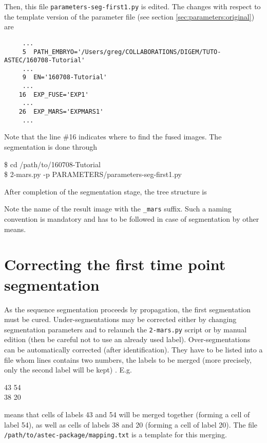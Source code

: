 Then, this file \texttt{parameters-seg-first1.py} is edited. The changes with respect to the template version of the parameter file (see section \ref{sec:parameters:original}) are

\begin{verbatim}
     ...
     5	PATH_EMBRYO='/Users/greg/COLLABORATIONS/DIGEM/TUTO-ASTEC/160708-Tutorial'	
     ...
     9	EN='160708-Tutorial'			
     ... 
    16	EXP_FUSE='EXP1'	
     ...
    26	EXP_MARS='EXPMARS1'		
     ...
\end{verbatim}

Note that the line \#16 indicates where to find the fused images.
The segmentation is done through

\begin{code}{0.8}
\$ cd /path/to/160708-Tutorial\\
\$ 2-mars.py -p PARAMETERS/parameters-seg-first1.py 
\end{code}


After completion of the segmentation stage, the tree structure is 

Note the name of the result image with the \texttt{\_mars} suffix. Such a naming convention is mandatory and has to be followed in case of segmentation by other means.










\section{Correcting the first time point segmentation}

As the sequence segmentation proceeds by propagation, the first segmentation must be cured. Under-segmentations may be corrected either by changing segmentation parameters and to relaunch the \texttt{2-mars.py}  script or by manual edition (then be careful not to use an already used label). Over-segmentations can be automatically corrected (after identification). They have to be listed into a file whom lines contains two numbers, the labels to be merged (more precisely, only the second label will be kept) . E.g.
\begin{code}{0.8}
43 54\\
38 20
\end{code}
means that cells of labels 43 and 54 will be merged together (forming a cell of label 54), as well as cells of labels 38 and 20 (forming a cell of label 20).
The file \texttt{/path/to/astec-package/mapping.txt} is a template for this merging.


